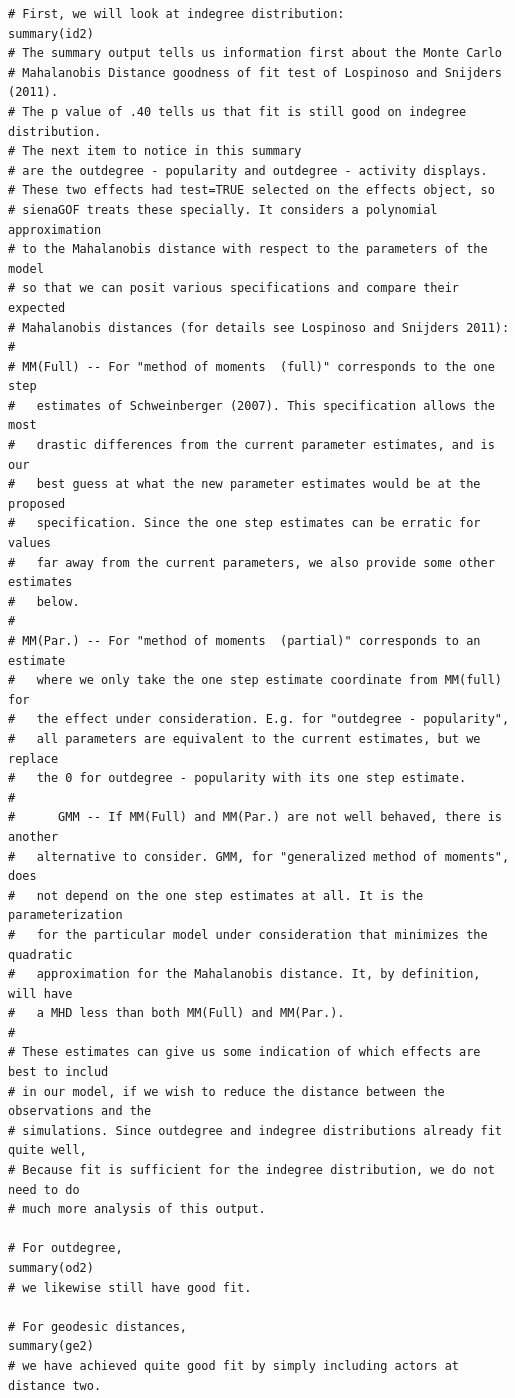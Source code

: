 \documentclass[a4paper,fleqn,11pt]{article}
\newcommand{\+}{\, + \,}
\begin{document}
{\begin{footnotesize}
\begin{verbatim}
# First, we will look at indegree distribution:
summary(id2)
# The summary output tells us information first about the Monte Carlo
# Mahalanobis Distance goodness of fit test of Lospinoso and Snijders (2011).
# The p value of .40 tells us that fit is still good on indegree distribution.
# The next item to notice in this summary
# are the outdegree - popularity and outdegree - activity displays.
# These two effects had test=TRUE selected on the effects object, so
# sienaGOF treats these specially. It considers a polynomial approximation
# to the Mahalanobis distance with respect to the parameters of the model
# so that we can posit various specifications and compare their expected
# Mahalanobis distances (for details see Lospinoso and Snijders 2011):
#
# MM(Full) -- For "method of moments  (full)" corresponds to the one step
# 	estimates of Schweinberger (2007). This specification allows the most
#	drastic differences from the current parameter estimates, and is our
#	best guess at what the new parameter estimates would be at the proposed
#	specification. Since the one step estimates can be erratic for values
#	far away from the current parameters, we also provide some other estimates
#	below.
#
# MM(Par.) -- For "method of moments  (partial)" corresponds to an estimate
#	where we only take the one step estimate coordinate from MM(full) for
#	the effect under consideration. E.g. for "outdegree - popularity",
#	all parameters are equivalent to the current estimates, but we replace
#	the 0 for outdegree - popularity with its one step estimate.
#
# 	   GMM -- If MM(Full) and MM(Par.) are not well behaved, there is another
#	alternative to consider. GMM, for "generalized method of moments", does
#	not depend on the one step estimates at all. It is the parameterization
#	for the particular model under consideration that minimizes the quadratic
#	approximation for the Mahalanobis distance. It, by definition, will have
#	a MHD less than both MM(Full) and MM(Par.).
#
# These estimates can give us some indication of which effects are best to includ
# in our model, if we wish to reduce the distance between the observations and the
# simulations. Since outdegree and indegree distributions already fit quite well,
# Because fit is sufficient for the indegree distribution, we do not need to do
# much more analysis of this output.

# For outdegree,
summary(od2)
# we likewise still have good fit.

# For geodesic distances,
summary(ge2)
# we have achieved quite good fit by simply including actors at distance two.


\end{verbatim}
\end{footnotesize}}
\end{document}
